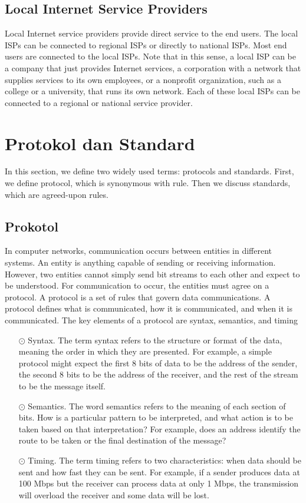 \subsection*{Local Internet Service Providers}
Local Internet service providers provide direct service to the end users. The local ISPs can be connected to regional ISPs or directly to national ISPs. Most end users are connected to the local ISPs. Note that in this sense, a local ISP can be a company that just provides Internet services, a corporation with a network that supplies services to its own employees, or a nonprofit organization, such as a college or a university, that runs its own network. Each of these local ISPs can be connected to a regional or national service provider.

\section{Protokol dan Standard}
In this section, we define two widely used terms: protocols and standards. First, we define protocol, which is synonymous with rule. Then we discuss standards, which are agreed-upon rules.

\subsection{Prokotol}
In computer networks, communication occurs between entities in different systems. An entity is anything capable of sending or receiving information. However, two entities cannot simply send bit streams to each other and expect to be understood. For communication to occur, the entities must agree on a protocol. A protocol is a set of rules that govern data communications. A protocol defines what is communicated, how it is communicated, and when it is communicated. The key elements of a protocol are syntax, semantics, and timing
\begin{itemize}
  \item[$\odot$] Syntax. The term syntax refers to the structure or format of the data, meaning the order in which they are presented. For example, a simple protocol might expect the first 8 bits of data to be the address of the sender, the second 8 bits to be the address of the receiver, and the rest of the stream to be the message itself. 
  \item[$\odot$] Semantics. The word semantics refers to the meaning of each section of bits. How is a particular pattern to be interpreted, and what action is to be taken based on that interpretation? For example, does an address identify the route to be taken or the final destination of the message? 
  \item[$\odot$] Timing. The term timing refers to two characteristics: when data should be sent and how fast they can be sent. For example, if a sender produces data at 100 Mbps but the receiver can process data at only 1 Mbps, the transmission will overload the receiver and some data will be lost.
\end{itemize}

